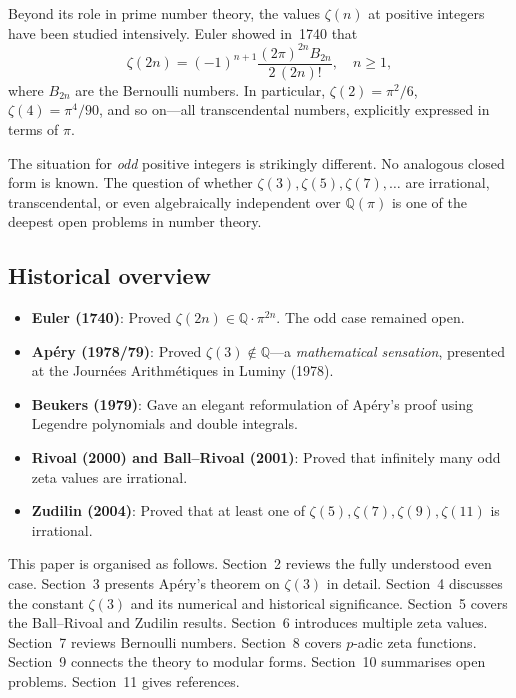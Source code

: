 \documentclass[12pt,a4paper]{amsart}
\theoremstyle{definition}
\theoremstyle{remark}
\begin{document}
Beyond its role in prime number theory, the values $\zeta(n)$ at positive integers
have been studied intensively. Euler showed in~1740 that
\[
  \zeta(2n) = (-1)^{n+1} \frac{(2\pi)^{2n} B_{2n}}{2\,(2n)!}, \quad n \geq 1,
\]
where $B_{2n}$ are the Bernoulli numbers. In particular, $\zeta(2) = \pi^2/6$,
$\zeta(4) = \pi^4/90$, and so on---all transcendental numbers, explicitly expressed
in terms of $\pi$.

The situation for \emph{odd} positive integers is strikingly different. No
analogous closed form is known. The question of whether $\zeta(3), \zeta(5),
\zeta(7), \ldots$ are irrational, transcendental, or even algebraically independent
over $\mathbb{Q}(\pi)$ is one of the deepest open problems in number theory.

\subsection*{Historical overview}

\begin{itemize}[leftmargin=2em]
  \item \textbf{Euler (1740)}: Proved $\zeta(2n) \in \mathbb{Q} \cdot \pi^{2n}$.
        The odd case remained open.
  \item \textbf{Apéry (1978/79)}: Proved $\zeta(3) \notin \mathbb{Q}$---a
        \emph{mathematical sensation}, presented at the Journées Arithmétiques in
        Luminy (1978).
  \item \textbf{Beukers (1979)}: Gave an elegant reformulation of Apéry's proof
        using Legendre polynomials and double integrals.
  \item \textbf{Rivoal (2000) and Ball--Rivoal (2001)}: Proved that infinitely many
        odd zeta values are irrational.
  \item \textbf{Zudilin (2004)}: Proved that at least one of $\zeta(5), \zeta(7),
        \zeta(9), \zeta(11)$ is irrational.
\end{itemize}

This paper is organised as follows. Section~2 reviews the fully understood even
case. Section~3 presents Apéry's theorem on $\zeta(3)$ in detail.
Section~4 discusses the constant $\zeta(3)$ and its numerical and historical
significance. Section~5 covers the Ball--Rivoal and Zudilin results.
Section~6 introduces multiple zeta values. Section~7 reviews Bernoulli numbers.
Section~8 covers $p$-adic zeta functions. Section~9 connects the theory to
modular forms. Section~10 summarises open problems. Section~11 gives references.
\end{document}
